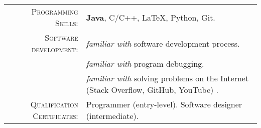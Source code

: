 %
%


 
\renewcommand{\arraystretch}{1.1}

	\begin{tabular}{>{}r>{}p{13cm}} 
		\textsc{Programming Skills:}    &  \textbf{Java}, C/C++, \LaTeX, Python, Git.\\  
		\textsc{Software development:} 		&  \emph{familiar with} software development process.\\
										&  \emph{familiar with} program debugging.\\
										&  \emph{familiar with} solving problems on the Internet (Stack Overflow, GitHub, YouTube) .\\
		\textsc{Qualification Certificates:}		&  Programmer (entry-level). \hspace{2em} Software designer (intermediate).
	\end{tabular}